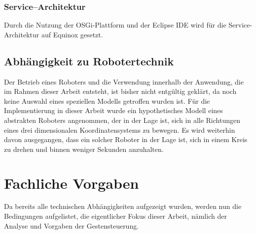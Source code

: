 \subsubsection{Service--Architektur}
Durch die Nutzung der OSGi-Plattform und der \gls{Eclipse} \acrshort{IDE} wird f\"ur die Service-Architektur auf \gls{Equinox} gesetzt. 

\subsection{Abh\"angigkeit zu Robotertechnik}
\label{subsec:Robot}
Der Betrieb eines Roboters und die Verwendung innerhalb der Anwendung, die im Rahmen dieser Arbeit entsteht, ist bisher nicht entg\"ultig gekl\"art, da noch keine Auswahl eines speziellen Modells getroffen wurden ist.
\newline
F\"ur die Implementierung in dieser Arbeit wurde ein hypothetisches Modell eines abstrakten Roboters angenommen, der in der Lage ist, sich in alle Richtungen eines drei dimensionalen Koordinatensystems zu bewegen. Es wird weiterhin davon ausgegangen, dass ein solcher Roboter in der Lage ist, sich in einem Kreis zu drehen und binnen weniger Sekunden anzuhalten.

\section{Fachliche Vorgaben}
Da bereits alle technischen Abh\"angigkeiten aufgezeigt wurden, werden nun die Bedingungen aufgelistet, die eigentlicher Fokus dieser Arbeit, n\"amlich der Analyse und Vorgaben der Gestensteuerung.

